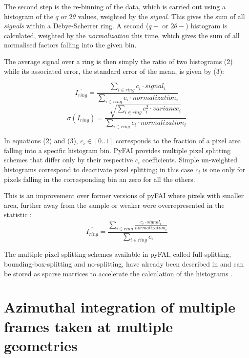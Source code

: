 \documentclass[preprint]{iucr}              %
\begin{document}
The second step is the re-binning of the data, which is carried out 
using a histogram of the $q$ or $2\theta$ values, weighted by the
\textit{signal}.
This gives the sum of all \textit{signals} within a Debye-Scherrer ring.
A second ($q-$ or $2\theta-$) histogram is calculated, weighted
by the \textit{normalization} this time, which gives the sum of all
normalised factors falling into the given bin.

The average signal over a ring is then simply the ratio of two histograms (2) 
while its associated error, the standard error of the mean, is given by (3):

\begin{equation}
\overline{I_{ring}} = \frac{\sum\limits_{i \in ring} c_i \cdot signal_i}
                        {\sum\limits_{i \in ring} c_i \cdot normalization_i} 
\end{equation}
\begin{equation}
\sigma(I_{ring}) = \frac{\sqrt{\sum\limits_{i \in ring} c_i^2 \cdot variance_i}}
                  {\sum\limits_{i \in ring} c_i \cdot normalization_i} 
\end{equation}

In equations (2) and (3), $c_i \in [0..1]$ corresponds to the fraction of a pixel area 
falling into a specific histogram bin. 
PyFAI provides multiple pixel splitting schemes that differ only by their
respective $c_i$ coefficients. 
Simple un-weighted histograms correspond to deactivate pixel splitting; in this
case $c_i$ is one only for pixels falling in the corresponding bin an zero for all
the others.

This is an improvement over former versions of pyFAI where pixels with
smaller area, further away from the sample or weaker were overrepresented in
the statistic :
\begin{equation}
\overline{I_{ring}} = \frac{\sum\limits_{i \in ring} \frac{ c_i \cdot
signal_i}{normalization_i}} {\sum\limits_{i \in ring} c_i} 
\end{equation}

The multiple pixel splitting schemes available in pyFAI, called full-splitting, 
bounding-box-splitting and no-splitting, have already been described in
  and can be stored as sparse matrices to accelerate the
 calculation of the histograms \cite{kieffer_ashiotis-proc-euroscipy-2014}.

\section{Azimuthal integration of multiple frames taken at multiple geometries}
\end{document}
